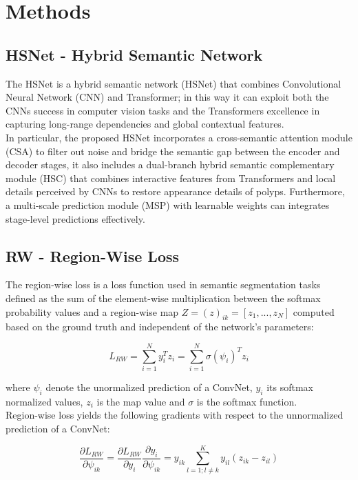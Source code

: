 \documentclass[
	a4paper, %
	10pt, %
	unnumberedsections, %
	twoside, %
]{LTJournalArticle}
\begin{document}

\section{Methods}

\subsection{HSNet - Hybrid Semantic Network}

The HSNet is a hybrid semantic network (HSNet) that combines Convolutional Neural Network (CNN) and Transformer; in this way it can exploit both the CNNs success in computer vision tasks and the Transformers excellence in capturing long-range dependencies and global contextual features.
\\
In particular, the proposed HSNet incorporates a cross-semantic attention module (CSA) to filter out noise and bridge the semantic gap between the encoder and decoder stages, it also includes a dual-branch hybrid semantic complementary module (HSC) that combines interactive features from Transformers and local details perceived by CNNs to restore appearance details of polyps. Furthermore, a multi-scale prediction module (MSP) with learnable weights can integrates stage-level predictions effectively.

\subsection{RW - Region-Wise Loss}

The region-wise loss is a loss function used in semantic segmentation tasks defined as the sum of the element-wise multiplication between the softmax probability values and a region-wise map $Z = (z)_{ik} = [z_1,...,z_N]$ computed based on the ground truth and independent of the network's parameters:

\begin{displaymath}
L_{RW} = \sum_{i=1}^{N}{y^{T}_iz_i} = \sum_{i=1}^{N}{\sigma(\psi_i)^{T}z_i}
\end{displaymath}

where $\psi_i$ denote the unormalized prediction of a ConvNet, $y_i$ its softmax normalized values, $z_i$ is the map value and $\sigma$ is the softmax function. \\
Region-wise loss yields the following gradients with respect to the unnormalized prediction of a ConvNet: 

\begin{displaymath}
\frac{\partial L_{RW}}{\partial\psi_{ik}} = \frac{\partial L_{RW}}{\partial y_{i}} \frac{\partial y_{i}}{\partial\psi_{ik}} = y_{ik} \sum_{l=1;l\neq k}^{K}{y_{il}(z_{ik}-z_{il})} 
\end{displaymath}
\end{document}
